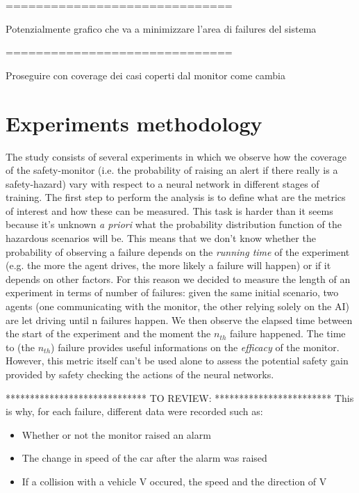==============================\newline

Potenzialmente grafico che va a minimizzare l'area di failures del sistema\newline

==============================\newline

Proseguire con coverage dei casi coperti dal monitor come cambia

\section{Experiments methodology}

The study consists of several experiments in which we observe how the coverage of the safety-monitor (i.e. the probability of raising an alert if there really is a safety-hazard) vary with respect to a neural network in different stages of training.\newline
The first step to perform the analysis is to define what are the metrics of interest and how these can be measured. This task is harder than it seems because it's unknown \textsl{a priori} what the probability distribution function of the hazardous scenarios will be. This means that we don't know whether the probability of observing a failure depends on the \textsl{running time} of the experiment (e.g. the more the agent drives, the more likely a failure will happen) or if it depends on other factors.\newline
For this reason we decided to measure the length of an experiment in terms of number of failures: given the same initial scenario, two agents (one communicating with the monitor, the other relying solely on the AI) are let driving until n failures happen. We then observe the elapsed time between the start of the experiment and the moment the $n_{th}$ failure happened.\newline
The time to (the $n_{th}$) failure provides useful informations on the \textsl{efficacy} of the monitor. However, this metric itself can't be used alone to assess the potential safety gain provided by safety checking the actions of the neural networks.\newline

*****************************\newline 
TO REVIEW: 
\newline *************************\newline
This is why, for each failure, different data were recorded such as:
\begin{itemize}
	\item Whether or not the monitor raised an alarm
	\item The change in speed of the car after the alarm was raised
	\item If a collision with a vehicle V occured, the speed and the direction of V
\end{itemize}

